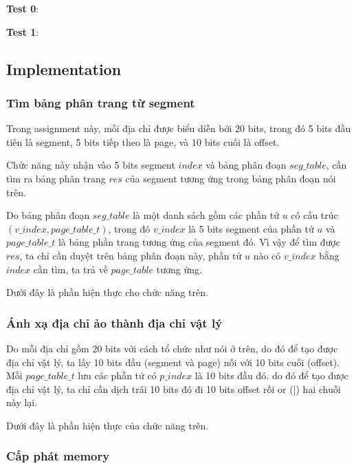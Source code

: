 \newpage
\textbf{Test 0}:


\newpage
\textbf{Test 1}:





\subsection{Implementation}
\subsubsection{Tìm bảng phân trang từ segment}

Trong assignment này, mỗi địa chỉ được biểu diễn bởi 20 bits, trong đó 5 bits đầu tiên là segment, 5 bits tiếp theo là page, và 10 bits cuối là offset.

Chức năng này nhận vào 5 bits segment $ index $ và bảng phân đoạn $ seg\_table $, cần tìm ra bảng phân trang $ res $ của segment tương ứng trong bảng phân đoạn nói trên.

Do bảng phân đoạn $ seg\_table $ là một danh sách gồm các phần tử $ u $ có cấu trúc $ (v\_index, page\_table\_t) $, trong đó $ v\_index $ là 5 bits segment của phần tử $ u $ và $  page\_table\_t $ là bảng phần trang tương ứng của segment đó. Vì vậy để tìm được $ res $, ta chỉ cần duyệt trên bảng phân đoạn này, phần tử $ u $ nào có $ v\_index $ bằng $ index $ cần tìm, ta trả về $ page\_table $ tương ứng.

Dưới đây là phần hiện thực cho chức năng trên.




\subsubsection{Ánh xạ địa chỉ ảo thành địa chỉ vật lý}

Do mỗi địa chỉ gồm 20 bits với cách tổ chức như nói ở trên, do đó để tạo được địa chỉ vật lý, ta lấy 10 bits đầu (segment và page) nối với 10 bits cuối (offset). Mỗi $ page\_table\_t $ lưu các phần tử có $ p\_index $ là 10 bits đầu đó. do đó để tạo được địa chỉ vật lý, ta chỉ cần dịch trái 10 bits đó đi 10  bits offset rồi or (|) hai chuỗi này lại.

Dưới đây là phần hiện thực của chức năng trên.




\newpage 
\subsubsection{Cấp phát memory}

